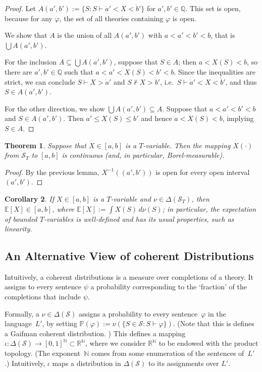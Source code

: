 \documentclass[12pt]{article}
\newcommand{\PP}{\mathbb{P}}
\newcommand{\vp}{\varphi}
\newcommand{\EE}{\mathbb{E}}
\newcommand{\RR}{\mathbb{R}}
\newcommand{\NN}{\mathbb{N}}
\newcommand{\QQ}{\mathbb{Q}}
\newcommand{\cL}{L'}
\newcommand{\cS}{\mathcal{S}}
\newcommand{\Tvar}{$T$-variable}
\theoremstyle{plain}
\newtheorem{theorem}{Theorem}[subsection]
\newtheorem{corollary}[theorem]{Corollary}
\theoremstyle{definition}
\theoremstyle{remark}
\begin{document}
\begin{proof}
Let $A(a',b') := \{S : S\vdash\dot a' < X < \dot b'\}$ for $a',b'\in\QQ$. 
This set is open, because for any $\vp$, the set of all theories containing $\vp$ is open. 

We show that $A$ is the union of all $A(a',b')$ with $a < a' < b' < b$, that is $\bigcup A(a',b')$.

For the inclusion $A \subseteq \bigcup A(a',b')$, suppose that $S\in A$; then $a < X(S) < b$, so there are $a',b'\in\QQ$ such that $a<a'<X(S)<b'<b$.
Since the inequalities are strict, we can conclude $S\vdash X > \dot a'$ and $S\nvdash X > \dot b'$, i.e.\ $S\vdash\dot a' < X < \dot b'$, and thus $S\in A(a',b')$.

For the other direction, we show $\bigcup A(a',b')\subseteq A$. 
Suppose that $a < a' < b' < b$ and $S\in A(a',b')$.
Then $a' \le X(S) \le b'$ and hence $a < X(S) < b$, implying $S\in A$.
\end{proof}
\begin{theorem}
Suppose that $X\in[a,b]$ is a \Tvar{}. Then the mapping $X(\cdot)$ from $\cS_T$ to $[a,b]$ is continuous (and, in particular, Borel-measurable).
\end{theorem}
\begin{proof}
By the previous lemma, $X^{-1}((a',b'))$ is open for every open interval $(a',b')$.

\end{proof}
\begin{corollary}
If $X\in[a,b]$ is a \Tvar{} and $\nu\in\Delta(\cS_T)$, then $\EE[X]\in[a,b]$, where $\EE[X] := \int X(S)\,d\nu(S)$; in particular, the expectation of bounded \Tvar{}s is well-defined and has its usual properties, such as linearity.
\end{corollary}
\subsection{An Alternative View of coherent Distributions} \label{An Alternative View of coherent Distributions}
Intuitively, a coherent distributions is a measure over completions of a theory. 
It assigns to every sentence $\psi$ a probability corresponding to the `fraction' of the completions that include $\psi$.

Formally, a $\nu\in\Delta(\cS)$ assigns a probability to every sentence~$\vp$ in the language~$\cL$, by setting $\PP(\vp) := \nu(\{S\in\cS:S\vdash\vp\})$. (Note that this is defines a Gaifman coherent distribution.
)
This defines a mapping $\iota : \Delta(\cS)\to [0,1]^\NN\subset\RR^\NN$, where we consider $\RR^\NN$ to be endowed with the product topology. 
(The exponent~$\NN$ comes from some enumeration of the sentences of~$\cL$.)
Intuitively, $\iota$ maps a distribution in $\Delta(\cS)$ to its assignments over $\cL$.
\end{document}
